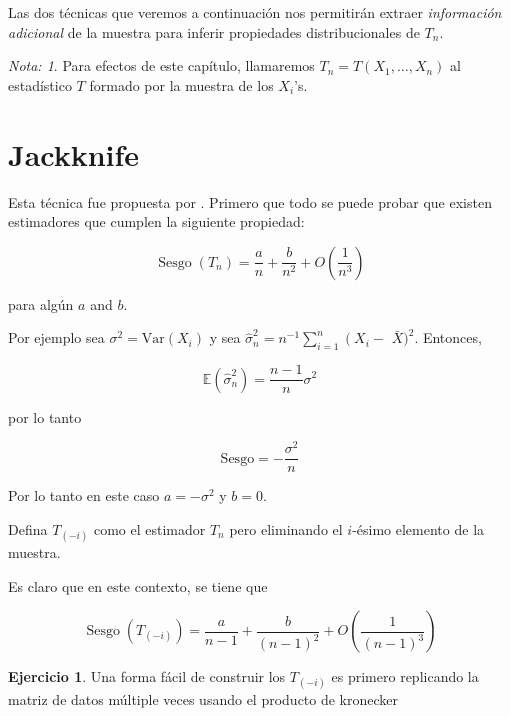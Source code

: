 \documentclass[
  12pt,
]{book}
\theoremstyle{definition}
\theoremstyle{definition}
\theoremstyle{definition}
\newtheorem{exercise}{Ejercicio}[chapter]
\theoremstyle{definition}
\theoremstyle{remark}
\newtheorem*{remark}{Nota: }
\begin{document}
Las dos técnicas que veremos a continuación nos permitirán extraer
\emph{información adicional} de la muestra para inferir propiedades distribucionales de \(T_n\).

\begin{remark}
Para efectos de este capítulo, llamaremos \(T_{n}=T\left(  X_{1},\ldots,X_{n}\right)\) al estadístico \(T\) formado por la muestra de
los \(X_{i}\)'s.
\end{remark}

\hypertarget{jackknife}{%
\section{Jackknife}\label{jackknife}}

Esta técnica fue propuesta por \autocite{Quenouille1949}. Primero que todo se puede probar que existen estimadores que cumplen la siguiente propiedad:

\begin{equation}
\operatorname{Sesgo}\left(T_{n}\right)=\frac{a}{n}+\frac{b}{n^{2}}+O\left(\frac{1}{n^{3}}\right)
\end{equation}

para algún \(a\) and \(b\).

Por ejemplo sea \(\sigma^{2}=\mathrm{Var}\left(X_{i}\right)\) y sea
\(\widehat{\sigma}_{n}^{2}=n^{-1} \sum_{i=1}^{n}\left(X_{i}-\right.\)
\(\bar{X})^{2}\). Entonces,

\begin{equation*}
\mathbb{E}\left(\widehat{\sigma}_{n}^{2}\right)=
\frac{n-1}{n}\sigma^{2}
\end{equation*}

por lo tanto

\begin{equation*}
\mathrm{Sesgo} = -\frac{\sigma^{2}}{n}
\end{equation*}

Por lo tanto en este caso \(a=-\sigma^{2}\) y \(b=0\).

Defina \(T_{(-i)}\) como el estimador \(T_{n}\) pero eliminando el
\(i\)-ésimo elemento de la muestra.

Es claro que en este contexto, se tiene que

\begin{equation}
\operatorname{Sesgo}\left(T_{(-i)}\right)=\frac{a}{n-1}+\frac{b}{(n-1)^{2}}+O\left(\frac{1}{(n-1)^{3}}\right)
\end{equation}

\begin{exercise}
\protect\hypertarget{exr:unnamed-chunk-70}{}\label{exr:unnamed-chunk-70}Una forma fácil de construir los \(T_{(-i)}\) es primero replicando
la matriz de datos múltiple veces usando el producto de kronecker
\end{exercise}
\end{document}
